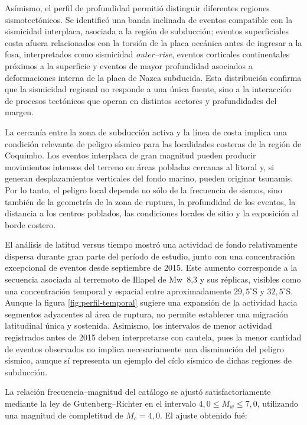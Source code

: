 \documentclass[a4paper,12pt]{article} %
\numberwithin{equation}{section} %
\numberwithin{figure}{section} %
\begin{document}
Asímismo, el perfil de profundidad permitió distinguir diferentes regiones sismotectónicos. Se identificó una banda inclinada de eventos compatible con la sismicidad interplaca, asociada a la región de subducción; eventos superficiales costa afuera relacionados con la torsión de la placa oceánica antes de ingresar a la fosa, interpretados como sismicidad \emph{outer--rise}, eventos corticales continentales próximos a la superficie y eventos de mayor profundidad asociados a deformaciones interna de la placa de Nazca subducida. Esta distribución confirma que la sismicidad regional no responde a una única fuente, sino a la interacción de procesos tectónicos que operan en distintos sectores y profundidades del margen.

La cercanía entre la zona de subducción activa y la línea de costa implica una condición relevante de peligro sísmico para las localidades costeras de la región de Coquimbo. Los eventos interplaca de gran magnitud pueden producir movimientos intensos del terreno en áreas pobladas cercanas al litoral y, si generan desplazamientos verticales del fondo marino, pueden originar tsunamis. Por lo tanto, el peligro local depende no sólo de la frecuencia de sismos, sino también de la geometría de la zona de ruptura, la profundidad de los eventos, la distancia a los centros poblados, las condiciones locales de sitio y la exposición al borde costero.

El análisis de latitud versus tiempo mostró una actividad de fondo relativamente dispersa durante gran parte del período de estudio, junto con una concentración excepcional de eventos desde septiembre de 2015. Este aumento corresponde a la secuencia asociada al terremoto de Illapel de Mw~8{,}3 y sus réplicas, visibles como una concentración temporal y espacial entre aproximadamente $29{,}5^\circ$S y $32{,}5^\circ$S. Aunque la figura \ref{fig:perfil-temporal} sugiere una expansión de la actividad hacia segmentos adyacentes al área de ruptura, no permite establecer una migración latitudinal única y sostenida. Asimismo, los intervalos de menor actividad registrados antes de 2015 deben interpretarse con cautela, pues la menor cantidad de eventos observados no implica necesariamente una disminución del peligro sísmico, aunque sí representa un ejemplo del cíclo sísmico de dichas regiones de subducción.

La relación frecuencia--magnitud del catálogo se ajustó satisfactoriamente mediante la ley de Gutenberg--Richter en el intervalo $4{,}0 \leq M_w \leq 7{,}0$, utilizando una magnitud de completitud de $M_c=4{,}0$. El ajuste obtenido fué:
\end{document}
